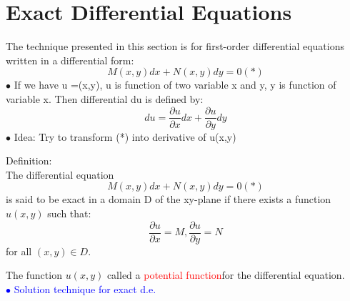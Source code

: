 \documentclass[12pt]{article}
\begin{document}
\section{Exact Differential Equations}
The technique presented in this section is for first-order differential
equations written in a differential form:\\
$$M(x,y)dx + N(x,y)dy = 0(*)$$
$\bullet$ If we have u =(x,y), u is function of two variable x and y, y is function of variable x. Then differential du is defined by: 
$$du = \frac{\partial u}{\partial x}dx + \frac{\partial u}{\partial y}dy$$
$\bullet$ Idea: Try to transform (*) into derivative of u(x,y)\\
\begin{mybox}
    Definition:  \\
    The differential equation\\
    $$M(x,y)dx + N(x,y)dy = 0(*)$$
    is said to be exact in a domain D of the xy-plane if there exists a
function $u(x, y)$ such that: \\
$$\frac{\partial u}{\partial x} = M,\frac{\partial u}{\partial y} =N$$
for all $(x,y) \in D$. 
\end{mybox}
The function $u(x,y)$ called a \textcolor{red}{potential function}for the differential
equation.
\\

\textcolor{blue}{$\bullet$ Solution technique for exact d.e. }
\end{document}
